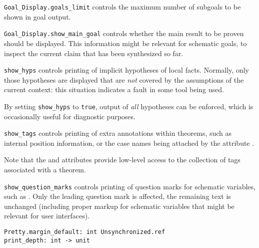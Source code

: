 \begin{isabellebody}
\begin{isamarkuptext}
\begin{description}
  \item \verb|Goal_Display.goals_limit| controls the maximum number of
  subgoals to be shown in goal output.

  \item \verb|Goal_Display.show_main_goal| controls whether the main
  result to be proven should be displayed.  This information might be
  relevant for schematic goals, to inspect the current claim that has
  been synthesized so far.

  \item \verb|show_hyps| controls printing of implicit hypotheses of
  local facts.  Normally, only those hypotheses are displayed that are
  \emph{not} covered by the assumptions of the current context: this
  situation indicates a fault in some tool being used.

  By setting \verb|show_hyps| to \verb|true|, output of \emph{all}
  hypotheses can be enforced, which is occasionally useful for
  diagnostic purposes.

  \item \verb|show_tags| controls printing of extra annotations within
  theorems, such as internal position information, or the case names
  being attached by the attribute \hyperlink{attribute.case-names}{\mbox{}}.

  Note that the \hyperlink{attribute.tagged}{\mbox{}} and \hyperlink{attribute.untagged}{\mbox{}}
  attributes provide low-level access to the collection of tags
  associated with a theorem.

  \item \verb|show_question_marks| controls printing of question marks
  for schematic variables, such as .  Only the leading
  question mark is affected, the remaining text is unchanged
  (including proper markup for schematic variables that might be
  relevant for user interfaces).

  \end{description}%
\end{isamarkuptext}%
\isamarkuptrue%
%
\isamarkuptrue%
%
\begin{isamarkuptext}%
\begin{mldecls}
    \verb|Pretty.margin_default: int Unsynchronized.ref| \\
    \verb|print_depth: int -> unit| \\
  \end{mldecls}


\end{isamarkuptext}
\end{isabellebody}
